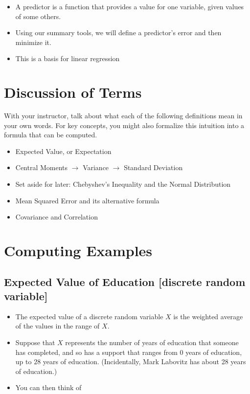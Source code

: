 \documentclass[
]{book}
\providecommand{\tightlist}{%
  \setlength{\itemsep}{0pt}\setlength{\parskip}{0pt}}
\theoremstyle{definition}
\theoremstyle{definition}
\theoremstyle{definition}
\theoremstyle{definition}
\theoremstyle{remark}
\begin{document}
\begin{itemize}
\tightlist
\item
  A predictor is a function that provides a value for one variable, given values of some others.
\item
  Using our summary tools, we will define a predictor's error and then minimize it.
\item
  This is a basis for linear regression
\end{itemize}

\hypertarget{discussion-of-terms}{%
\section{Discussion of Terms}\label{discussion-of-terms}}

With your instructor, talk about what each of the following definitions mean in your own words. For key concepts, you might also formalize this intuition into a formula that can be computed.

\begin{itemize}
\tightlist
\item
  Expected Value, or Expectation
\item
  Central Moments \(\rightarrow\) Variance \(\rightarrow\) Standard Deviation
\item
  Set aside for later: Chebyshev's Inequality and the Normal Distribution
\item
  Mean Squared Error and its alternative formula
\item
  Covariance and Correlation
\end{itemize}

\hypertarget{computing-examples}{%
\section{Computing Examples}\label{computing-examples}}

\hypertarget{expected-value-of-education-discrete-random-variable}{%
\subsection{Expected Value of Education {[}discrete random variable{]}}\label{expected-value-of-education-discrete-random-variable}}

\begin{itemize}
\tightlist
\item
  The expected value of a discrete random variable \(X\) is the weighted average of the values in the range of \(X\).
\item
  Suppose that \(X\) represents the number of years of education that someone has completed, and so has a support that ranges from \(0\) years of education, up to \(28\) years of education. (Incidentally, Mark Labovitz has about 28 years of education.)
\item
  You can then think of
\end{itemize}
\end{document}
